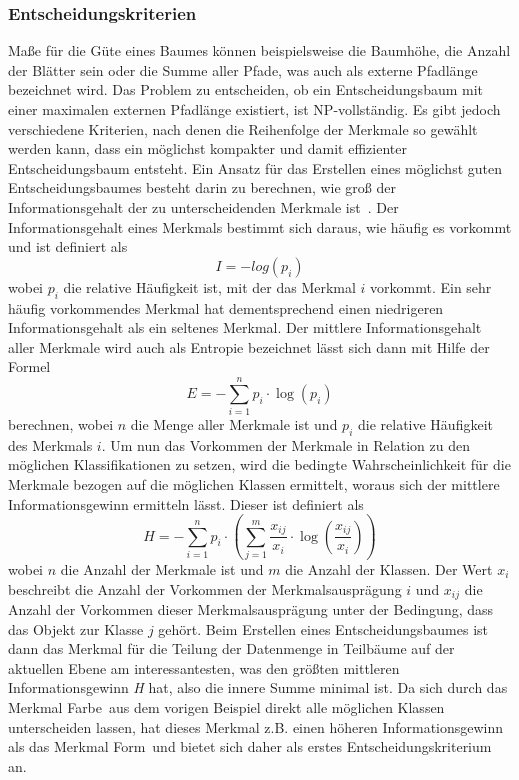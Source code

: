 \subsubsection{Entscheidungskriterien}
Maße für die Güte eines Baumes können beispielsweise die Baumhöhe, die Anzahl der Blätter sein oder die Summe aller Pfade, was auch als externe Pfadlänge bezeichnet wird. Das Problem zu entscheiden, ob ein Entscheidungsbaum mit einer maximalen externen Pfadlänge existiert, ist NP-vollständig. Es gibt jedoch verschiedene Kriterien, nach denen die Reihenfolge der Merkmale so gewählt werden kann, dass ein möglichst kompakter und damit effizienter Entscheidungsbaum entsteht. Ein Ansatz für das Erstellen eines möglichst guten Entscheidungsbaumes besteht darin zu berechnen, wie groß der Informationsgehalt der zu unterscheidenden Merkmale ist~\cite{Shannon}. Der Informationsgehalt eines Merkmals bestimmt sich daraus, wie häufig es vorkommt und ist definiert als 
\[I = -log \left( p_i \right)\] wobei $p_i$ die relative Häufigkeit ist, mit der das Merkmal $i$ vorkommt. Ein sehr häufig vorkommendes Merkmal hat dementsprechend einen niedrigeren Informationsgehalt als ein seltenes Merkmal. Der mittlere Informationsgehalt aller Merkmale wird auch als Entropie bezeichnet lässt sich dann mit Hilfe der Formel 
\[E = - \sum \limits_{i=1}^n p_i \cdot \log \left( p_i \right)\] berechnen, wobei $n$ die Menge aller Merkmale ist und $p_i$ die relative Häufigkeit des Merkmals $i$.
Um nun das Vorkommen der Merkmale in Relation zu den möglichen Klassifikationen zu setzen, wird die bedingte Wahrscheinlichkeit für die Merkmale bezogen auf die möglichen Klassen ermittelt, woraus sich der mittlere Informationsgewinn ermitteln lässt. Dieser ist definiert als 
\[H = - \sum \limits_{i=1}^n p_i \cdot \left( \sum \limits_{j=1}^m \frac{x_{ij}}{x_i} \cdot \log \left(\frac{x_{ij}}{x_i}\right)\right) \] wobei $n$ die Anzahl der Merkmale ist und $m$ die Anzahl der Klassen. Der Wert $x_i$ beschreibt die Anzahl der Vorkommen der Merkmalsausprägung $i$ und $x_{ij}$ die Anzahl der Vorkommen dieser Merkmalsausprägung unter der Bedingung, dass das Objekt zur Klasse $j$ gehört.
Beim Erstellen eines Entscheidungsbaumes ist dann das Merkmal für die Teilung der Datenmenge in Teilbäume auf der aktuellen Ebene am interessantesten, was den größten mittleren Informationsgewinn \textit{H} hat, also die innere Summe minimal ist.
Da sich durch das Merkmal \glqq Farbe\grqq\ aus dem vorigen Beispiel direkt alle möglichen Klassen unterscheiden lassen, hat dieses Merkmal z.B. einen höheren Informationsgewinn als das Merkmal \glqq Form\grqq\ und bietet sich daher als erstes Entscheidungskriterium an.

